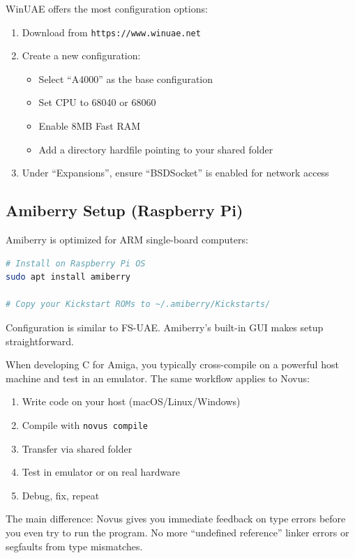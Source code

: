 WinUAE offers the most configuration options:

\begin{enumerate}
\item Download from \texttt{https://www.winuae.net}

\item Create a new configuration:
\begin{itemize}
    \item Select ``A4000'' as the base configuration
    \item Set CPU to 68040 or 68060
    \item Enable 8MB Fast RAM
    \item Add a directory hardfile pointing to your shared folder
\end{itemize}

\item Under ``Expansions'', ensure ``BSDSocket'' is enabled for network access
\end{enumerate}

\subsection{Amiberry Setup (Raspberry Pi)}

Amiberry is optimized for ARM single-board computers:

\begin{lstlisting}[language=bash]
# Install on Raspberry Pi OS
sudo apt install amiberry

# Copy your Kickstart ROMs to ~/.amiberry/Kickstarts/
\end{lstlisting}

Configuration is similar to FS-UAE. Amiberry's built-in GUI makes setup straightforward.

\begin{comingfromc}
When developing C for Amiga, you typically cross-compile on a powerful host machine and test in an emulator. The same workflow applies to Novus:

\begin{enumerate}
\item Write code on your host (macOS/Linux/Windows)
\item Compile with \texttt{novus compile}
\item Transfer via shared folder
\item Test in emulator or on real hardware
\item Debug, fix, repeat
\end{enumerate}

The main difference: Novus gives you immediate feedback on type errors before you even try to run the program. No more ``undefined reference'' linker errors or segfaults from type mismatches.
\end{comingfromc}

